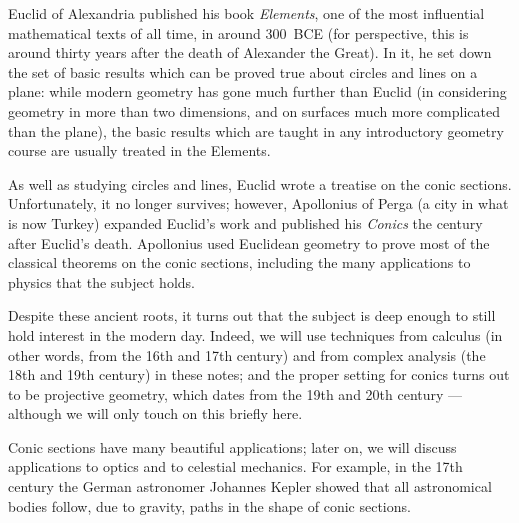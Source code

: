 \documentclass[a4paper,leqno,9pt]{article}
\theoremstyle{exercise}
\theoremstyle{plain}
\theoremstyle{definition}
\theoremstyle{remark}
\begin{document}
Euclid of Alexandria published his book \emph{Elements}, one of the most influential mathematical texts of all time, in around
300~BCE (for perspective, this is around thirty years after the death of Alexander the Great). In it, he set down the set
of basic results which can be proved true about circles and lines on a plane: while modern geometry has gone much further than
Euclid (in considering geometry in more than two dimensions, and on surfaces much more complicated than the plane), the basic
results which are taught in any introductory geometry course are usually treated in the Elements.

As well as studying circles and lines, Euclid wrote a treatise on the conic sections. Unfortunately, it no longer survives;
however, Apollonius of Perga (a city in what is now Turkey) expanded Euclid's work and published his \emph{Conics} the century
after Euclid's death. Apollonius used Euclidean geometry to prove most of the classical theorems on the conic sections, including
the many applications to physics that the subject holds.

Despite these ancient roots, it turns out that the subject is deep enough to still hold interest in the modern day. Indeed, we
will use techniques from calculus (in other words, from the 16th and 17th century) and from complex analysis (the 18th and 19th
century) in these notes; and the proper setting for conics turns out to be projective geometry, which dates from the 19th and 20th
century --- although we will only touch on this briefly here.

Conic sections have many beautiful applications; later on, we will discuss applications to optics and to celestial mechanics. For
example, in the 17th century the German astronomer Johannes Kepler showed that all astronomical bodies follow, due to gravity,
paths in the shape of conic sections.
\end{document}
